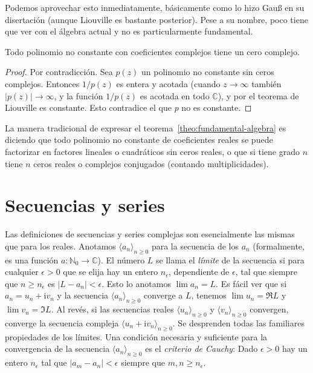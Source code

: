   Podemos aprovechar esto inmediatamente,
  básicamente como lo hizo Gauß en su disertación
  (aunque Liouville es bastante posterior).
  Pese a su nombre,
  poco tiene que ver con el álgebra actual
  y no es particularmente fundamental.
  \begin{theorem}
    \label{theo:fundamental-algebra}
    Todo polinomio no constante con coeficientes complejos
    tiene un cero complejo.
  \end{theorem}
  \begin{proof}
    Por contradicción.
    Sea \(p(z)\) un polinomio no constante sin ceros complejos.
    Entonces \(1 / p(z)\) es entera y acotada
    (cuando \(z \rightarrow \infty\)
     también \(\lvert p(z) \rvert \rightarrow \infty\),
     y la función \(1 / p(z)\) es acotada en todo \(\mathbb{C}\)),
    y por el teorema de Liouville es constante.
    Esto contradice el que \(p\) no es constante.
  \end{proof}
  La manera tradicional
  de expresar el teorema~\ref{theo:fundamental-algebra}
  es diciendo que todo polinomio no constante
  de coeficientes reales
  se puede factorizar en factores lineales
  o cuadráticos sin ceros reales,
  o que si tiene grado \(n\)
  tiene \(n\) ceros reales o complejos conjugados
  (contando multiplicidades).

\section{Secuencias y series}
\label{sec:complex-sequences-series}

  Las definiciones de secuencias y series complejas
  son esencialmente las mismas que para los reales.
  Anotamos \(\langle a_n \rangle_{n \ge 0}\)
  para la secuencia de los \(a_n\)
  (formalmente,
   es una función
     \(a \colon \mathbb{N}_0 \rightarrow \mathbb{C}\)).%
  El número \(L\) se llama el \emph{límite} de la secuencia
  si para cualquier \(\epsilon > 0\) que se elija
  hay un entero \(n_\epsilon\),
  dependiente de \(\epsilon\),
  tal que siempre que \(n \ge n_\epsilon\)
  es \(\lvert L - a_n \rvert < \epsilon\).
  Esto lo anotamos \(\lim a_n = L\).%
  Es fácil ver que si \(a_n = u_n + \mathrm{i} v_n\)
  y la secuencia \(\langle a_n \rangle_{n \ge 0}\) converge a \(L\),
  tenemos \(\lim u_n = \Re L\) y \(\lim v_n = \Im L\).
  Al revés,
  si las secuencias reales \(\langle u_n \rangle_{n \ge 0}\)
  y \(\langle v_n \rangle_{n \ge 0}\) convergen,
  converge la secuencia compleja
    \(\langle u_n + \mathrm{i} v_n \rangle_{n \ge 0}\).
  Se desprenden todas las familiares propiedades de los límites.
  Una condición necesaria y suficiente
  para la convergencia
  de la secuencia \(\langle a_n \rangle_{n \ge 0}\)
  es el \emph{criterio de Cauchy}:%
  Dado \(\epsilon > 0\)
  hay un entero \(n_\epsilon\)
  tal que \(\lvert a_m - a_n \rvert < \epsilon\)
  siempre que \(m, n \ge n_\epsilon\).

